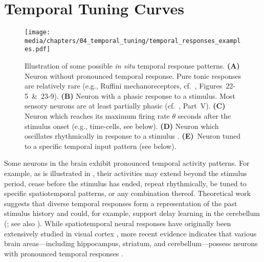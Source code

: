 
\section{Temporal Tuning Curves}
\label{sec:temporal_tuning_curves}

\begin{figure}
	\centering
	\texttt{[image: media/chapters/04\_temporal\_tuning/temporal\_responses\_examples.pdf]}%
	{\label{fig:temporal_responses_examples_a}}%
	{\label{fig:temporal_responses_examples_b}}%
	{\label{fig:temporal_responses_examples_c}}%
	{\label{fig:temporal_responses_examples_d}}%
	{\label{fig:temporal_responses_examples_e}}%
	\caption[Illustration of possible in situ temporal response patterns]{Illustration of some possible \emph{in situ} temporal response patterns.
	\textbf{(A)} Neuron without pronounced temporal response.
	Pure tonic responses are relatively rare (e.g., Ruffini mechanoreceptors, cf.~\cite{kandel2012principles}, Figures~22-5~\&~23-9).
	\textbf{(B)} Neuron with a phasic response to a stimulus. Most sensory neurons are at least partially phasic (cf.~\cite{kandel2012principles}, Part~V).
	\textbf{(C)} Neuron which reaches its maximum firing rate $\theta$ seconds after the stimulus onset (e.g., time-cells, see below).
	\textbf{(D)} Neuron which oscillates rhythmically in response to a stimulus \citep[e.g.,][]{friedman-hill2000dynamics}.
	\textbf{(E)}~Neuron tuned to a specific temporal input pattern (see below).
	}
	\label{fig:temporal_responses_examples}
\end{figure}

Some neurons in the brain exhibit pronounced temporal activity patterns.
For example, as is illustrated in , their activities may extend beyond the stimulus period, cease before the stimulus has ended, repeat rhythmically, be tuned to specific spatiotemporal patterns, or any combination thereof.
Theoretical work suggests that diverse temporal responses form a representation of the past stimulus history \citep{grossberg1989neural,howard2014unified,voelker2018improving} and could, for example, support delay learning in the cerebellum (\cite{fujita1982adaptive,medina2000computer}; see also ).
While spatiotemporal neural responses have originally been extensively studied in visual cortex \citep[e.g.,][]{deangelis1993spatiotemporal,carandini1999linearity}, more recent evidence indicates that various brain areas---including hippocampus, striatum, and cerebellum---possess neurons with pronounced temporal responses \citep[e.g.,][]{lusk2016cerebellar}.

